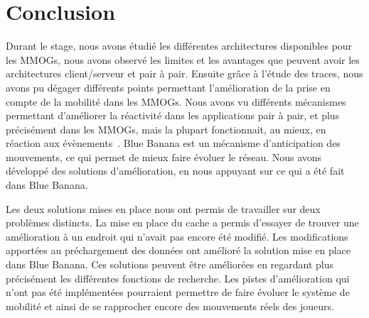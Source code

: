 \section{Conclusion}
	Durant le stage, nous avons étudié les différentes architectures disponibles pour les MMOGs, nous avons observé les limites et les avantages que peuvent avoir les architectures client/serveur et pair à pair. Ensuite grâce à l'étude des traces, nous avons pu dégager différents points permettant l'amélioration de la prise en compte de la mobilité dans les MMOGs. Nous avons vu différents mécanismes permettant d'améliorer la réactivité dans les applications pair à pair, et plus précisément dans les MMOGs, mais la plupart fonctionnait, au mieux, en réaction aux évènements~\cite{10.1109/SRDS.2006.33}. Blue Banana est un mécanisme d'anticipation des mouvements, ce qui permet de mieux faire évoluer le réseau. Nous avons développé des solutions d'amélioration, en nous appuyant sur ce qui a été fait dans Blue Banana.\\

	\par Les deux solutions mises en place nous ont permis de travailler sur deux problèmes distincts. La mise en place du cache a permis d'essayer de trouver une amélioration à un endroit qui n'avait pas encore été modifié. Les modifications apportées au préchargement des données ont amélioré la solution mise en place dans Blue Banana. Ces solutions peuvent être améliorées en regardant plus précisément les différentes fonctions de recherche. Les pistes d'amélioration qui n'ont pas été implémentées pourraient permettre de faire évoluer le système de mobilité et ainsi de se rapprocher encore des mouvements réels des joueurs. 	
